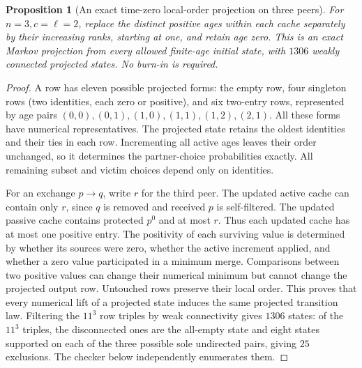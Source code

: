 \documentclass[11pt]{article}
\newtheorem{proposition}[theorem]{Proposition}
\begin{document}
\begin{proposition}[An exact time-zero local-order projection on three peers]
\label{prop:c2threeorderprojection}
For $n=3,c=\ell=2$, replace the distinct positive ages within
\emph{each cache separately} by their increasing ranks, starting
at one, and retain age zero. This is an exact Markov projection
from every allowed finite-age initial state, with $1306$ weakly
connected projected states. No burn-in is required.
\end{proposition}
\begin{proof}
A row has eleven possible projected forms: the empty row,
four singleton rows (two identities, each zero or positive),
and six two-entry rows, represented by age pairs
$(0,0),(0,1),(1,0),(1,1),(1,2),(2,1)$.
All these forms have numerical representatives. The projected
state retains the oldest identities and their ties in each row.
Incrementing all active ages leaves their order unchanged, so
it determines the partner-choice probabilities exactly.
All remaining subset and victim choices depend only on identities.

For an exchange $p\to q$, write $r$ for the third peer.
The updated active cache can contain only $r$, since $q$ is
removed and received $p$ is self-filtered. The updated passive
cache contains protected $p^0$ and at most $r$.
Thus each updated cache has at most one positive entry.
The positivity of each surviving value is determined by whether
its sources were zero, whether the active increment applied,
and whether a zero value participated in a minimum merge.
Comparisons between two positive values can change their numerical
minimum but cannot change the projected output row. Untouched
rows preserve their local order. This proves that every numerical
lift of a projected state induces the same projected transition
law. Filtering the $11^3$ row triples by weak connectivity gives
$1306$ states: of the $11^3$ triples, the disconnected ones
are the all-empty state and eight states supported on each
of the three possible sole undirected pairs, giving $25$
exclusions. The checker below independently enumerates them.
\end{proof}
\end{document}
